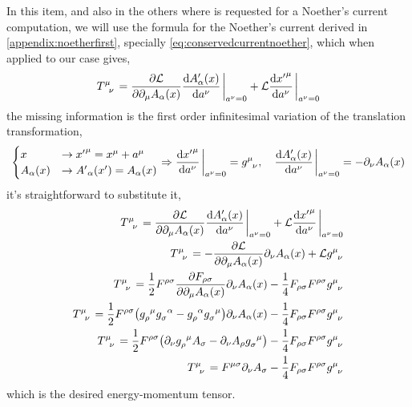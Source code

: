 In this item, and also in the others where is requested for a Noether's current computation, we will use the formula for the 
Noether's current derived in \cref{appendix:noetherfirst}, specially \cref{eq:conservedcurrentnoether}, which when applied to 
our case gives,
\begin{align}
    \tensor{T}{^\mu_\nu} =\pdv{\mathcal L}{\partial_\mu A_\alpha\qty(x)}\dv{A_\alpha'\qty(x)}{a^\nu}\eval_{a^\nu=0}+\mathcal L\dv{{x'}^\mu}{a^\nu}\eval_{a^\nu=0}
\end{align}
the missing information is the first order infinitesimal variation of the translation transformation,
\begin{align}
    \begin{cases}
        x&\rightarrow {x'}^\mu = x^\mu+a^\mu\\
        A_\alpha\qty(x)&\rightarrow {A'}_\alpha\qty(x')=A_\alpha\qty(x)
    \end{cases}\Rightarrow \dv{{x'}^\mu}{a^\nu}\eval_{a^\nu=0}=\tensor{g}{^\mu_\nu},\ \ \ \dv{A'_\alpha\qty(x)}{a^\nu}\eval_{a^\nu=0}=-\partial_\nu A_\alpha\qty(x)
\end{align}
it's straightforward to substitute it,
\begin{align}
    \tensor{T}{^\mu_\nu} =\pdv{\mathcal L}{\partial_\mu A_\alpha\qty(x)}\dv{A'_\alpha\qty(x)}{a^\nu}\eval_{a^\nu=0}+\mathcal L\dv{{x'}^\mu}{a^\nu}\eval_{a^\nu=0}\\
    \tensor{T}{^\mu_\nu} =-\pdv{\mathcal L}{\partial_\mu A_\alpha\qty(x)}\partial_\nu A_\alpha\qty(x)+\mathcal L\tensor{g}{^\mu_\nu}\\
    \tensor{T}{^\mu_\nu} =\frac12F^{\rho\sigma}\pdv{F_{\rho\sigma}}{\partial_\mu A_\alpha\qty(x)}\partial_\nu A_\alpha\qty(x)-\frac14 F_{\rho\sigma}F^{\rho\sigma}\tensor{g}{^\mu_\nu}\\
    \tensor{T}{^\mu_\nu} =\frac12F^{\rho\sigma}\qty(\tensor{g}{_\rho^\mu}\tensor{g}{_\sigma^\alpha}-\tensor{g}{_\rho^\alpha}\tensor{g}{_\sigma^\mu})\partial_\nu A_\alpha\qty(x)-\frac14 F_{\rho\sigma}F^{\rho\sigma}\tensor{g}{^\mu_\nu}\\
    \tensor{T}{^\mu_\nu} =\frac12F^{\rho\sigma}\qty(\partial_\nu\tensor{g}{_\rho^\mu}A_\sigma-\partial_\nu A_\rho\tensor{g}{_\sigma^\mu})-\frac14 F_{\rho\sigma}F^{\rho\sigma}\tensor{g}{^\mu_\nu}\\
    \tensor{T}{^\mu_\nu} =F^{\mu\sigma}\partial_\nu A_\sigma-\frac14 F_{\rho\sigma}F^{\rho\sigma}\tensor{g}{^\mu_\nu}\label{eq:emtensoreletro}
\end{align}
which is the desired energy-momentum tensor.

